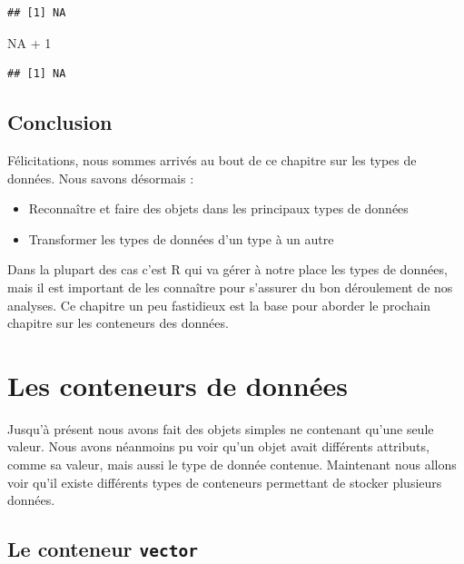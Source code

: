 \documentclass[twoside,symmetric]{book}
\newenvironment{Shaded}{}{}
\newcommand{\DecValTok}[1]{#1}
\newcommand{\OperatorTok}[1]{#1}
\newcommand{\OtherTok}[1]{#1}
\newcommand{\StringTok}[1]{#1}
\providecommand{\tightlist}{%
  \setlength{\itemsep}{0pt}\setlength{\parskip}{0pt}}
\begin{document}
\begin{verbatim}
## [1] NA
\end{verbatim}

\begin{Shaded}
\begin{Highlighting}[]
\OtherTok{NA} \OperatorTok{+}\StringTok{ }\DecValTok{1}
\end{Highlighting}
\end{Shaded}

\begin{verbatim}
## [1] NA
\end{verbatim}

\hypertarget{conclusion-2}{%
\section{Conclusion}\label{conclusion-2}}

Félicitations, nous sommes arrivés au bout de ce chapitre sur les types de données. Nous savons désormais :

\begin{itemize}
\tightlist
\item
  Reconnaître et faire des objets dans les principaux types de données
\item
  Transformer les types de données d'un type à un autre
\end{itemize}

Dans la plupart des cas c'est R qui va gérer à notre place les types de données, mais il est important de les connaître pour s'assurer du bon déroulement de nos analyses. Ce chapitre un peu fastidieux est la base pour aborder le prochain chapitre sur les conteneurs des données.

\hypertarget{dataType2}{%
\chapter{Les conteneurs de données}\label{dataType2}}

\minitoc

Jusqu'à présent nous avons fait des objets simples ne contenant qu'une seule valeur. Nous avons néanmoins pu voir qu'un objet avait différents attributs, comme sa valeur, mais aussi le type de donnée contenue. Maintenant nous allons voir qu'il existe différents types de conteneurs permettant de stocker plusieurs données.

\hypertarget{l014vector}{%
\section{\texorpdfstring{Le conteneur \texttt{vector}}{Le conteneur vector}}\label{l014vector}}
\end{document}
